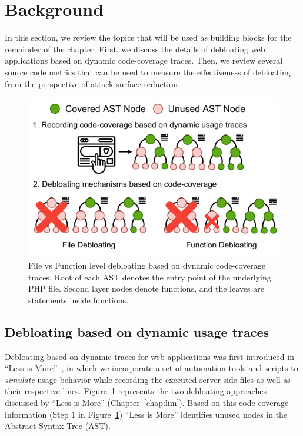 \section{Background}

In this section, we review the topics that will be used as building blocks for the remainder of the chapter. 
First, we discuss the details of debloating web applications based on dynamic code-coverage traces. 
Then, we review several source code metrics that can be used to measure the effectiveness of debloating from the perspective of attack-surface reduction.

\begin{figure}[t]
    \centering
    \includegraphics[width=0.75\columnwidth]{figures/dbltr/file_vs_function_debloating.drawio.pdf}
    \caption{File vs Function level debloating based on dynamic code-coverage traces. Root of each AST denotes the entry point of the underlying PHP file. Second layer nodes denote functions, and the leaves are statements inside functions.}
    \label{fig:file_vs_func_debloating}
\end{figure}

\subsection{Debloating based on dynamic usage traces}
Debloating based on dynamic traces for web applications was first introduced in ``Less is More''~\cite{lessismore}, in which we incorporate a set of automation tools and scripts to \emph{simulate} usage behavior while recording the executed server-side files as well as their respective lines.
Figure~\ref{fig:file_vs_func_debloating} represents the two debloating approaches discussed by ``Less is More'' (Chapter~\ref{chap:lim}). 
Based on this code-coverage information (Step 1 in Figure~\ref{fig:file_vs_func_debloating}) ``Less is More'' identifies unused nodes in the Abstract Syntax Tree (AST). 

